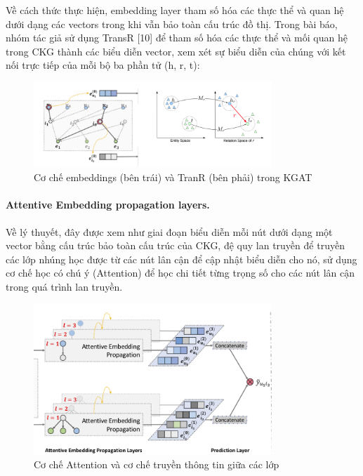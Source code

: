 Về cách thức thực hiện, embedding layer tham số hóa các thực thể và quan hệ dưới dạng các vectors trong khi vẫn bảo toàn cấu trúc đồ thị. Trong bài báo, nhóm tác giả sử dụng TransR [10] để tham số hóa các thực thể và mối quan hệ trong CKG thành các biểu diễn vector, xem xét sự biểu diễn của chúng với kết nối trực tiếp của mỗi bộ ba phần tử (h, r, t):

\begin{figure}[h]
    \centering
    \includegraphics[width=0.8\textwidth]{figures/67.png}
    \caption{Cơ chế embeddings (bên trái) và TranR (bên phải) trong KGAT}
    \label{fig:embedding_process}
\end{figure}

\paragraph{Attentive Embedding propagation layers.}
Về lý thuyết, đây được xem như giai đoạn biểu diễn mỗi nút dưới dạng một vector bằng cấu trúc bảo toàn cấu trúc của CKG, đệ quy lan truyền để truyền các lớp nhúng học được từ các nút lân cận để cập nhật biểu diễn cho nó, sử dụng cơ chế học có chú ý (Attention) để học chi tiết từng trọng số cho các nút lân cận trong quá trình lan truyền.

\begin{figure}[h]
    \centering
    \includegraphics[width=0.8\textwidth]{figures/68.png}
    \caption{Cơ chế Attention và cơ chế truyền thông tin giữa các lớp}
    \label{fig:attention_process}
\end{figure}


